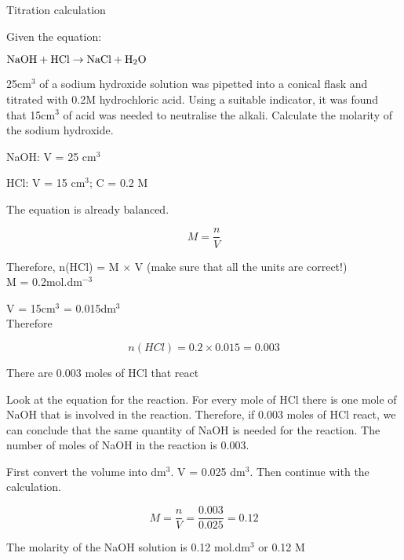 \begin{wex}{Titration calculation\\}{
Given the equation:
\begin{center}
$\rm{NaOH + HCl \rightarrow NaCl + H_{2}O}$
\end{center}

25cm$^{3}$ of a sodium hydroxide solution was pipetted into a conical flask and titrated with 0.2M hydrochloric acid. Using a suitable indicator, it was found that 15cm$^{3}$ of acid was needed to neutralise the alkali. Calculate the molarity of the sodium hydroxide.\\
}

{

NaOH: V = 25 cm$^{3}$

HCl: V = 15 cm$^{3}$; C = 0.2 M

The equation is already balanced.\\

\begin{equation*}
M = \frac{n}{V}
\end{equation*}

Therefore, n(HCl) = M $\times$ V (make sure that all the units are correct!)\\

M = 0.2mol.dm$^{-3}$

V = 15cm$^{3}$ = 0.015dm$^{3}$ \\

Therefore

\begin{equation*}
n(HCl) = 0.2 \times 0.015 = 0.003
\end{equation*}

There are 0.003 moles of HCl that react\\

Look at the equation for the reaction. For every mole of HCl there is one mole of NaOH that is involved in the reaction. Therefore, if 0.003 moles of HCl react, we can conclude that the same quantity of NaOH is needed for the reaction. The number of moles of NaOH in the reaction is 0.003.\\

First convert the volume into dm$^{3}$. V = 0.025 dm$^{3}$. Then continue with the calculation.

\begin{equation*}
M = \frac{n}{V} = \frac{0.003}{0.025} = 0.12
\end{equation*}

The molarity of the NaOH solution is 0.12 mol.dm$^{3}$ or 0.12 M
}
\end{wex}

